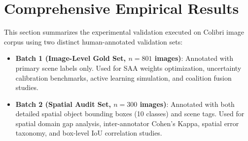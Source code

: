 \documentclass[11pt,a4paper]{article}
\newcommand{\term}[1]{\textbf{#1}}
\begin{document}
\newpage
\section{Comprehensive Empirical Results}

This section summarizes the experimental validation executed on Colibri image corpus using two distinct human-annotated validation sets:
\begin{itemize}[leftmargin=*]
    \item \term{Batch 1 (Image-Level Gold Set, $n=801$ images)}: Annotated with primary scene labels only. Used for SAA weights optimization, uncertainty calibration benchmarks, active learning simulation, and coalition fusion studies.
    \item \term{Batch 2 (Spatial Audit Set, $n=300$ images)}: Annotated with both detailed spatial object bounding boxes (10 classes) and scene tags. Used for spatial domain gap analysis, inter-annotator Cohen's Kappa, spatial error taxonomy, and box-level IoU correlation studies.
\end{itemize}
\end{document}
